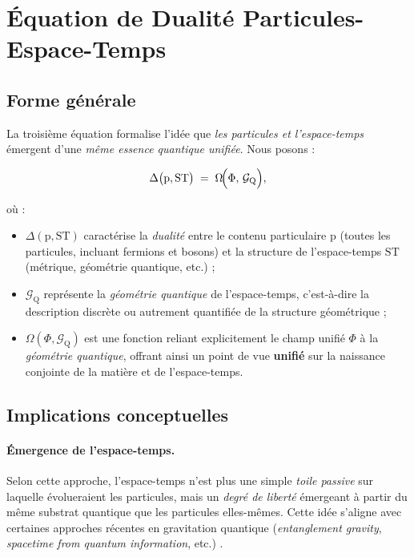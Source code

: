 \documentclass[12pt]{article}
\begin{document}
\section{Équation de Dualité Particules-Espace-Temps}

\subsection{Forme générale}

La troisième équation formalise l'idée que \emph{les particules et l'espace-temps} 
émergent d'une \emph{même essence quantique unifiée}. Nous posons :

\begin{equation}
\label{eq:dual_particules_espace}
\Delta \bigl(\mathrm{p}, \mathrm{ST}\bigr) 
\;=\; \Omega\!\Bigl(\Phi,\, \mathcal{G}_\mathrm{Q}\Bigr),
\end{equation}

où :
\begin{itemize}
    \item $\Delta(\mathrm{p}, \mathrm{ST})$ caractérise la \emph{dualité} entre le 
          contenu particulaire $\mathrm{p}$ (toutes les particules, incluant fermions et bosons) 
          et la structure de l'espace-temps $\mathrm{ST}$ (métrique, géométrie quantique, etc.) ;
    \item $\mathcal{G}_\mathrm{Q}$ représente la \emph{géométrie quantique} de l'espace-temps, 
          c'est-à-dire la description discrète ou autrement quantifiée de la structure géométrique ;
    \item $\Omega(\Phi, \mathcal{G}_\mathrm{Q})$ est une fonction reliant explicitement 
          le champ unifié $\Phi$ à la \emph{géométrie quantique}, offrant ainsi 
          un point de vue \textbf{unifié} sur la naissance conjointe de la matière et de l'espace-temps.
\end{itemize}

\subsection{Implications conceptuelles}

\paragraph{Émergence de l'espace-temps.}
Selon cette approche, l'espace-temps n'est plus une simple \emph{toile passive} 
sur laquelle évolueraient les particules, mais un \emph{degré de liberté} 
émergeant à partir du même substrat quantique que les particules elles-mêmes. 
Cette idée s'aligne avec certaines approches récentes en gravitation quantique 
(\emph{entanglement gravity}, \emph{spacetime from quantum information}, etc.) 
\cite{vanraamsdonk2010building}.
\end{document}
